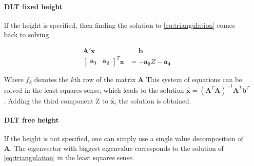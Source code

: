 \paragraph{DLT fixed height} 
If the height is specified, then finding the solution to \eqref{eq:triangulation} comes back to solving

\begin{align}
    \mathbf{A'}\mathbf{x}&=\mathbf{b}\\  
    \begin{bmatrix} \mathbf{a_1} & \mathbf{a_2} \end{bmatrix}^T \mathbf{x} &= -\mathbf{a_3}Z-\mathbf{a_4}
\end{align}

Where $f_k$ denotes the $k$th row of the matrix $\mathbf{A}$
This system of equations can be solved in the least-squares sense, which leads to the solution $\mathbf{\hat{x}}=(\mathbf{A}^T\mathbf{A})^{-1}\mathbf{A}^T\mathbf{b}^T$. Adding the third component Z to $\mathbf{\hat{x}}$, the solution is obtained.

\paragraph{DLT free height}

If the height is not specified, one can simply use a single value decomposition of $\mathbf{A}$. The eigenvector with biggest eigenvalue corresponds to the solution of \eqref{eq:triangulation} in the least squares sense.


